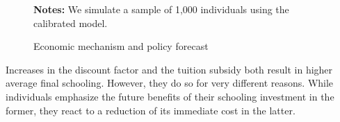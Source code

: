 \begin{figure}[b!]\centering
\caption{Economic mechanism and policy forecast}\label{Economic mechanism and policy forecast}
\hspace{0.3cm}
\begin{center}
\begin{minipage}[t]{0.675\columnwidth}
\item \scriptsize{\textbf{Notes:} We simulate a sample of 1,000 individuals using the calibrated model.}
\end{minipage}
\end{center}
\end{figure}%

Increases in the discount factor and the tuition subsidy both result in higher average final schooling. However, they do so for very different reasons. While individuals emphasize the future benefits of their schooling investment in the former, they react to a reduction of its immediate cost in the latter.
